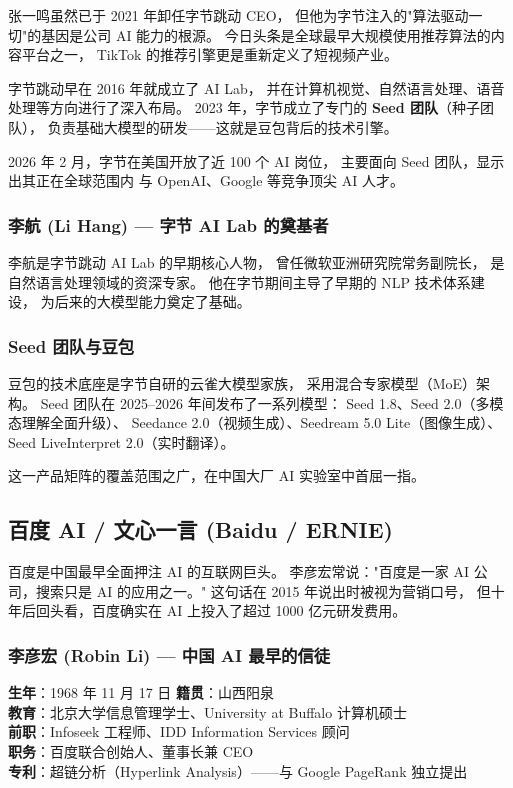 张一鸣虽然已于 2021 年卸任字节跳动 CEO，
但他为字节注入的"算法驱动一切"的基因是公司 AI 能力的根源。
今日头条是全球最早大规模使用推荐算法的内容平台之一，
TikTok 的推荐引擎更是重新定义了短视频产业。

字节跳动早在 2016 年就成立了 AI Lab，
并在计算机视觉、自然语言处理、语音处理等方向进行了深入布局。
2023 年，字节成立了专门的 \textbf{Seed 团队}（种子团队），
负责基础大模型的研发——这就是豆包背后的技术引擎。

2026 年 2 月，字节在美国开放了近 100 个 AI 岗位，
主要面向 Seed 团队，显示出其正在全球范围内
与 OpenAI、Google 等竞争顶尖 AI 人才。

\subsubsection{李航 (Li Hang) — 字节 AI Lab 的奠基者}

李航是字节跳动 AI Lab 的早期核心人物，
曾任微软亚洲研究院常务副院长，
是自然语言处理领域的资深专家。
他在字节期间主导了早期的 NLP 技术体系建设，
为后来的大模型能力奠定了基础。

\subsubsection{Seed 团队与豆包}

豆包的技术底座是字节自研的云雀大模型家族，
采用混合专家模型（MoE）架构。
Seed 团队在 2025--2026 年间发布了一系列模型：
Seed 1.8、Seed 2.0（多模态理解全面升级）、
Seedance 2.0（视频生成）、Seedream 5.0 Lite（图像生成）、
Seed LiveInterpret 2.0（实时翻译）。

这一产品矩阵的覆盖范围之广，在中国大厂 AI 实验室中首屈一指。


\subsection{百度 AI / 文心一言 (Baidu / ERNIE)}

百度是中国最早全面押注 AI 的互联网巨头。
李彦宏常说："百度是一家 AI 公司，搜索只是 AI 的应用之一。"
这句话在 2015 年说出时被视为营销口号，
但十年后回头看，百度确实在 AI 上投入了超过 1000 亿元研发费用。

\subsubsection{李彦宏 (Robin Li) — 中国 AI 最早的信徒}

\begin{keybox}
\textbf{生年}：1968 年 11 月 17 日 \quad \textbf{籍贯}：山西阳泉 \\
\textbf{教育}：北京大学信息管理学士、University at Buffalo 计算机硕士 \\
\textbf{前职}：Infoseek 工程师、IDD Information Services 顾问 \\
\textbf{职务}：百度联合创始人、董事长兼 CEO \\
\textbf{专利}：超链分析（Hyperlink Analysis）——与 Google PageRank 独立提出
\end{keybox}

